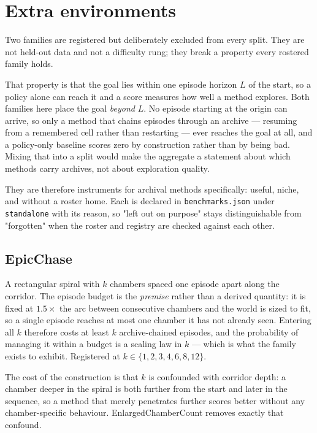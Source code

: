 \documentclass[11pt]{article}
\begin{document}
\section{Extra environments}
\label{sec:extra-envs}

Two families are registered but deliberately excluded from every
split. They are not held-out data and not a difficulty rung; they
break a property every rostered family holds.

That property is that the goal lies within one episode horizon $L$ of
the start, so a policy alone can reach it and a score measures how
well a method explores. Both families here place the goal
\emph{beyond} $L$. No episode starting at the origin can arrive, so
only a method that chains episodes through an archive --- resuming
from a remembered cell rather than restarting --- ever reaches the
goal at all, and a policy-only baseline scores zero by construction
rather than by being bad. Mixing that into a split would make the
aggregate a statement about which methods carry archives, not about
exploration quality.

They are therefore instruments for archival methods specifically:
useful, niche, and without a roster home. Each is declared in
\texttt{benchmarks.json} under \texttt{standalone} with its reason, so
"left out on purpose" stays distinguishable from "forgotten" when the
roster and registry are checked against each other.

\subsection{EpicChase}

A rectangular spiral with $k$ chambers spaced one episode apart along
the corridor. The episode budget is the \emph{premise} rather than a
derived quantity: it is fixed at $1.5\times$ the arc between
consecutive chambers and the world is sized to fit, so a single
episode reaches at most one chamber it has not already seen. Entering
all $k$ therefore costs at least $k$ archive-chained episodes, and the
probability of managing it within a budget is a scaling law in $k$ ---
which is what the family exists to exhibit. Registered at
$k \in \{1,2,3,4,6,8,12\}$.

The cost of the construction is that $k$ is confounded with corridor
depth: a chamber deeper in the spiral is both further from the start
and later in the sequence, so a method that merely penetrates further
scores better without any chamber-specific behaviour.
EnlargedChamberCount removes exactly that confound.
\end{document}
